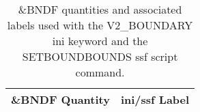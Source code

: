 \begin{table}[bph]
\begin{center}
\caption{\&BNDF quantities and associated labels used with the V2\_BOUNDARY ini keyword and the SETBOUNDBOUNDS ssf script command.}
\vspace{0.1in}
\begin{tabular}{|l|l|}
\hline
\&BNDF Quantity & ini/ssf Label \\ \hline
\end{tabular}
\label{tabBNDF}
\end{center}
\end{table}
